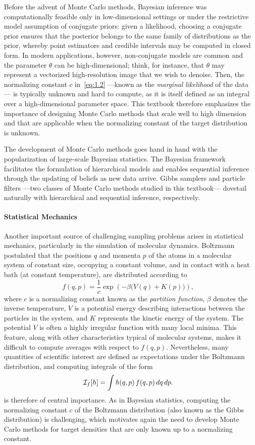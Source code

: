 Before the advent of Monte Carlo methods, Bayesian inference was computationally feasible only in
low-dimensional settings or under the restrictive model assumption of conjugate priors: given a
likelihood, choosing a conjugate prior ensures that the posterior belongs to the same family of
distributions as the prior, whereby point estimators and credible intervals may be computed in
closed form. In modern applications, however, non-conjugate models are common and the parameter
$\theta$ can be high-dimensional; think, for instance, that $\theta$ may represent a vectorized
high-resolution image that we wish to denoise. Then, the normalizing constant $c$ in~\eqref{eq:1.2}
---known as the \textit{marginal likelihood} of the data--- is typically unknown and hard to compute,
as it is itself defined as an integral over a high-dimensional parameter space. This textbook therefore
emphasizes the importance of designing Monte Carlo methods that scale well to high dimension and that
are applicable when the normalizing constant of the target distribution is unknown.

The development of Monte Carlo methods goes hand in hand with the popularization of large-scale
Bayesian statistics. The Bayesian framework facilitates the formulation of hierarchical models and
enables sequential inference through the updating of beliefs as new data arrive. Gibbs samplers and
particle filters ---two classes of Monte Carlo methods studied in this textbook--- dovetail naturally
with hierarchical and sequential inference, respectively.

\paragraph{Statistical Mechanics}
Another important source of challenging sampling problems arises in statistical mechanics,
particularly in the simulation of molecular dynamics. Boltzmann postulated that the positions $q$
and momenta $p$ of the atoms in a molecular system of constant size, occupying a constant volume,
and in contact with a heat bath (at constant temperature), are distributed according to
\[
  f(q,p) = \frac{1}{c}\exp\!\left(-\beta\bigl(V(q) + K(p)\bigr)\right),
\]
where $c$ is a normalizing constant known as the \textit{partition function}, $\beta$ denotes the
inverse temperature, $V$ is a potential energy describing interactions between the particles in the
system, and $K$ represents the kinetic energy of the system. The potential $V$ is often a highly
irregular function with many local minima. This feature, along with other characteristics typical of
molecular systems, makes it difficult to compute averages with respect to $f(q,p)$. Nevertheless,
many quantities of scientific interest are defined as expectations under the Boltzmann distribution,
and computing integrals of the form
\[
  \mathcal{I}_f[h] = \int h(q,p)\,f(q,p)\,dq\,dp.
\]
is therefore of central importance. As in Bayesian statistics, computing the normalizing constant $c$
of the Boltzmann distribution (also known as the Gibbs distribution) is challenging, which motivates
again the need to develop Monte Carlo methods for target densities that are only known up to a
normalizing constant.
